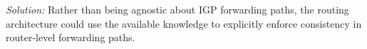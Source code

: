 \vspace{0.05in}
\noindent
{\em Solution:} 
Rather than being agnostic about IGP forwarding paths, the routing
architecture could use the available knowledge to explicitly enforce
consistency in router-level forwarding paths.
\vspace{0.05in}


